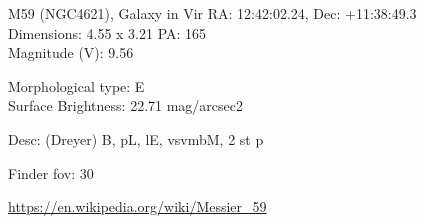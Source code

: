 \begin{block}{M59 (NGC4621), Galaxy in Vir}
    RA: 12:42:02.24, Dec: +11:38:49.3 \\ 
    Dimensions: 4.55 x 3.21 PA: 165 \\ 
    Magnitude (V): 9.56

    Morphological type: E \\ 
    Surface Brightness: 22.71 mag/arcsec2 

    Desc: (Dreyer) B, pL, lE, vsvmbM, 2 st p 

    Finder fov: 30 

    \url{https://en.wikipedia.org/wiki/Messier_59} 
\end{block}